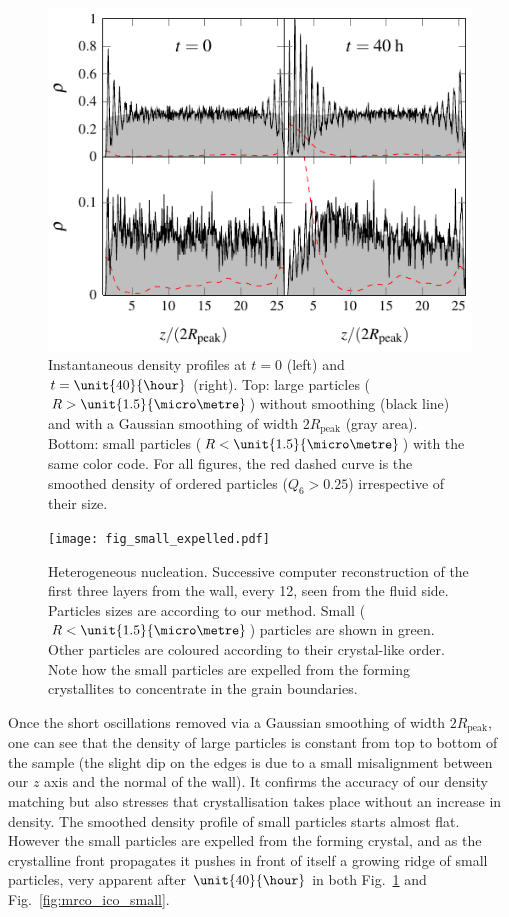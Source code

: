 \documentclass[8.5pt,twoside,twocolumn]{article}
\begin{document}
\begin{figure}
	\centering
	\includegraphics{fig_profiles.pdf}
	\caption{Instantaneous density profiles at $t=0$ (left) and $t=\unit{40}{\hour}$ (right). Top: large particles ($R>\unit{1.5}{\micro\metre}$) without smoothing (black line) and with a Gaussian smoothing of width $2R_\text{peak}$ (gray area). Bottom: small particles ($R<\unit{1.5}{\micro\metre}$) with the same color code. 
For all figures, the red dashed curve is the smoothed density of ordered particles ($Q_6>0.25$) irrespective of their size.}
	\label{fig:profiles}
\end{figure}


\begin{figure}
	\centering
	\texttt{[image: fig\_small\_expelled.pdf]}
	\caption{Heterogeneous nucleation. Successive computer reconstruction of the first three layers from the wall, every \unit{12}{\hour}, seen from the fluid side. Particles sizes are according to our method. Small ($R<\unit{1.5}{\micro\metre}$) particles are shown in green. Other particles are coloured according to their crystal-like order. Note how the small particles are expelled from the forming crystallites to concentrate in the grain boundaries.}
	\label{fig:small_expelled}
\end{figure}

Once the short oscillations removed via a Gaussian smoothing of width $2R_\text{peak}$, one can see that the density of large particles is constant from top to bottom of the sample (the slight dip on the edges is due to a small misalignment between our $z$ axis and the normal of the wall). It confirms the accuracy of our density matching but also stresses that crystallisation takes place without an increase in density. The smoothed density profile of small particles starts almost flat. However the small particles are expelled from the forming crystal, and as the crystalline front propagates it pushes in front of itself a growing ridge of small particles, very apparent after $\unit{40}{\hour}$ in both Fig.~\ref{fig:profiles} and Fig.~\ref{fig:mrco_ico_small}.
\end{document}
